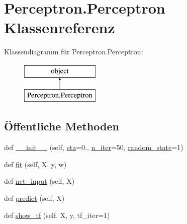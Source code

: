 \hypertarget{class_perceptron_1_1_perceptron}{}\section{Perceptron.\+Perceptron Klassenreferenz}
\label{class_perceptron_1_1_perceptron}
Klassendiagramm für Perceptron.\+Perceptron\+:\begin{figure}[H]
\begin{center}
\leavevmode
\includegraphics[height=2.000000cm]{class_perceptron_1_1_perceptron}
\end{center}
\end{figure}
\subsection*{Öffentliche Methoden}
\begin{DoxyCompactItemize}
\item 
def \mbox{\hyperlink{class_perceptron_1_1_perceptron_a612d2470864b433455123ab67596c79e}{\+\_\+\+\_\+init\+\_\+\+\_\+}} (self, \mbox{\hyperlink{class_perceptron_1_1_perceptron_a74c50bc1321f3e226ca4e0f96316378d}{eta}}=0., \mbox{\hyperlink{class_perceptron_1_1_perceptron_a39c8cf01e04f72473ea4b817fbc32405}{n\+\_\+iter}}=50, \mbox{\hyperlink{class_perceptron_1_1_perceptron_ab6afa4dc8b06b17e82885aaf6c20aa81}{random\+\_\+state}}=1)
\item 
def \mbox{\hyperlink{class_perceptron_1_1_perceptron_a2479bd0c6de945508cf00933916bb2a6}{fit}} (self, X, y, w)
\item 
def \mbox{\hyperlink{class_perceptron_1_1_perceptron_a21cab7a11445f766e6258d71529da03f}{net\+\_\+input}} (self, X)
\item 
def \mbox{\hyperlink{class_perceptron_1_1_perceptron_abe5ade4bde9e08101baaec87b53e7b6e}{predict}} (self, X)
\item 
def \mbox{\hyperlink{class_perceptron_1_1_perceptron_a5d312133ac49a2238ef5f06dc0917592}{show\+\_\+tf}} (self, X, y, tf\+\_\+iter=1)
\end{DoxyCompactItemize}
